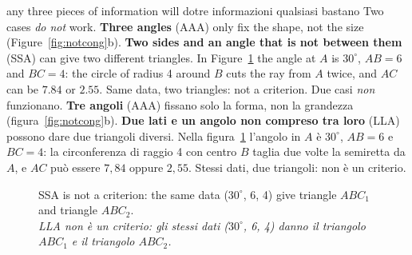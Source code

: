 \documentclass[10pt,a4paper,oneside]{book}
\newcommand{\bicap}[2]{\caption{#1\\{\color{itgreen}\itshape #2}}}
\begin{document}
\begin{trap}{any three pieces of information will do}{tre informazioni qualsiasi bastano}
Two cases \emph{do not} work. \textbf{Three angles} (AAA) only fix the shape, not the size (Figure~\ref{fig:notcong}b). \textbf{Two sides and an angle that is not between them} (SSA) can give two different triangles. In Figure~\ref{fig:ssa} the angle at $A$ is $30^\circ$, $AB = 6$ and $BC = 4$: the circle of radius 4 around $B$ cuts the ray from $A$ twice, and $AC$ can be $7.84$ or $2.55$. Same data, two triangles: not a criterion.
\tcblower
Due casi \emph{non} funzionano. \textbf{Tre angoli} (AAA) fissano solo la forma, non la grandezza (figura~\ref{fig:notcong}b). \textbf{Due lati e un angolo non compreso tra loro} (LLA) possono dare due triangoli diversi. Nella figura~\ref{fig:ssa} l'angolo in $A$ è $30^\circ$, $AB = 6$ e $BC = 4$: la circonferenza di raggio 4 con centro $B$ taglia due volte la semiretta da $A$, e $AC$ può essere $7{,}84$ oppure $2{,}55$. Stessi dati, due triangoli: non è un criterio.
\end{trap}

\begin{figure}[htbp]
\centering
\bicap{SSA is not a criterion: the same data ($30^\circ$, 6, 4) give triangle $ABC_1$ and triangle $ABC_2$.}%
      {LLA non è un criterio: gli stessi dati ($30^\circ$, 6, 4) danno il triangolo $ABC_1$ e il triangolo $ABC_2$.}
\label{fig:ssa}
\end{figure}
\end{document}
